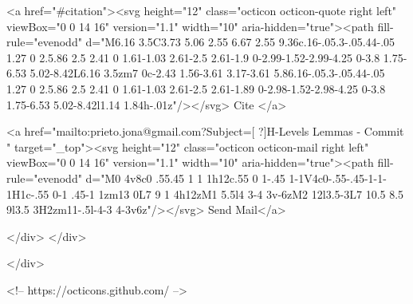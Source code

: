       <a  href="#citation"><svg height="12" class="octicon octicon-quote right left" viewBox="0 0 14 16" version="1.1" width="10" aria-hidden="true"><path fill-rule="evenodd" d="M6.16 3.5C3.73 5.06 2.55 6.67 2.55 9.36c.16-.05.3-.05.44-.05 1.27 0 2.5.86 2.5 2.41 0 1.61-1.03 2.61-2.5 2.61-1.9 0-2.99-1.52-2.99-4.25 0-3.8 1.75-6.53 5.02-8.42L6.16 3.5zm7 0c-2.43 1.56-3.61 3.17-3.61 5.86.16-.05.3-.05.44-.05 1.27 0 2.5.86 2.5 2.41 0 1.61-1.03 2.61-2.5 2.61-1.89 0-2.98-1.52-2.98-4.25 0-3.8 1.75-6.53 5.02-8.42l1.14 1.84h-.01z"/></svg> Cite
      </a>

      <a href="mailto:prieto.jona@gmail.com?Subject=[ ?]H-Levels Lemmas - Commit " target="_top"><svg height="12" class="octicon octicon-mail right left" viewBox="0 0 14 16" version="1.1" width="10" aria-hidden="true"><path fill-rule="evenodd" d="M0 4v8c0 .55.45 1 1 1h12c.55 0 1-.45 1-1V4c0-.55-.45-1-1-1H1c-.55 0-1 .45-1 1zm13 0L7 9 1 4h12zM1 5.5l4 3-4 3v-6zM2 12l3.5-3L7 10.5 8.5 9l3.5 3H2zm11-.5l-4-3 4-3v6z"/></svg> Send Mail</a>

    </div>
  </div>

</div>

<!-- https://octicons.github.com/ -->





